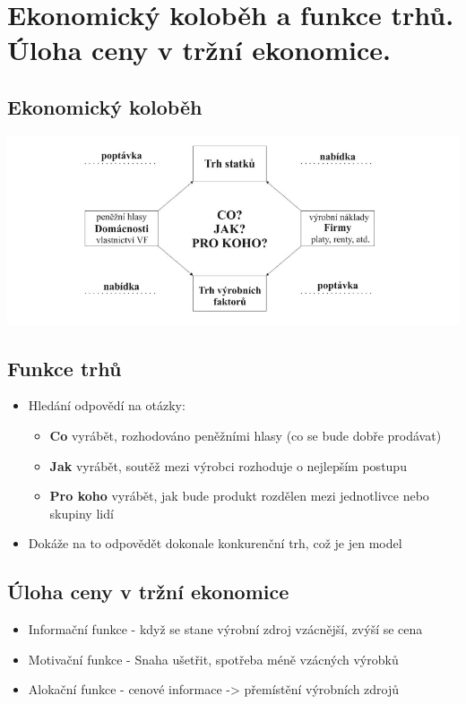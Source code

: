 \clearpage
\section{Ekonomický koloběh a funkce trhů. Úloha ceny v tržní ekonomice.}

\subsection{Ekonomický koloběh}
\includegraphics[width=16cm]{images/kolobeh.png}

\subsection{Funkce trhů}
\begin{itemize}
    \item Hledání odpovědí na otázky:
    \begin{itemize}
        \item \textbf{Co} vyrábět, rozhodováno peněžními hlasy (co se bude dobře prodávat)
        \item \textbf{Jak} vyrábět, soutěž mezi výrobci rozhoduje o nejlepším postupu
        \item \textbf{Pro koho} vyrábět, jak bude produkt rozdělen mezi jednotlivce nebo skupiny lidí
    \end{itemize}
    \item Dokáže na to odpovědět dokonale konkurenční trh, což je jen model
\end{itemize}

\subsection{Úloha ceny v tržní ekonomice}
\begin{itemize}
    \item Informační funkce - když se stane výrobní zdroj vzácnější, zvýší se cena
    \item Motivační funkce - Snaha ušetřit, spotřeba méně vzácných výrobků
    \item Alokační funkce - cenové informace -> přemístění výrobních zdrojů
\end{itemize}